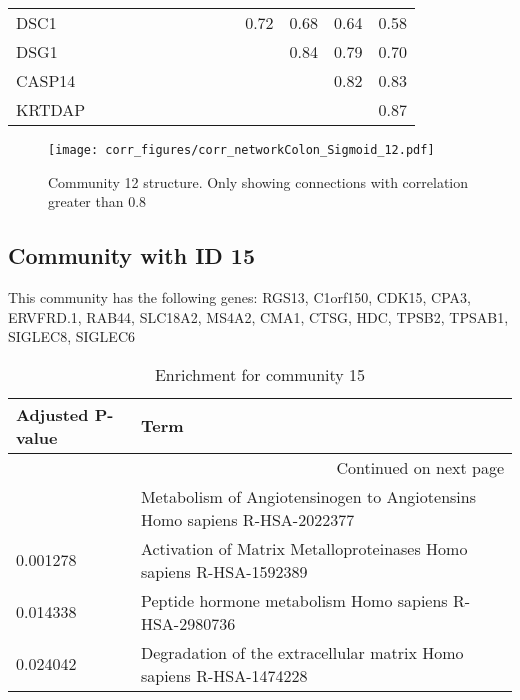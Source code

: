 \begin{longtable}{lrrrrrrrrrrrrr}
DSC1      &            &           &              &            &            &                 &             &             &            &       0.72 &         0.68 &         0.64 &       0.58 \\
DSG1      &            &           &              &            &            &                 &             &             &            &            &         0.84 &         0.79 &       0.70 \\
CASP14    &            &           &              &            &            &                 &             &             &            &            &              &         0.82 &       0.83 \\
KRTDAP    &            &           &              &            &            &                 &             &             &            &            &              &              &       0.87 \\
\end{longtable}


\begin{figure}[h!]
\centering
\texttt{[image: corr\_figures/corr\_networkColon\_Sigmoid\_12.pdf]}
\caption{Community 12 structure. Only showing connections with correlation greater than 0.8}
\end{figure}




\subsection*{Community with ID 15}
This community has the following genes: RGS13, C1orf150, CDK15, CPA3, ERVFRD.1, RAB44, SLC18A2, MS4A2, CMA1, CTSG, HDC, TPSB2, TPSAB1, SIGLEC8, SIGLEC6
\\
\begin{longtable}{p{2.4cm}p{14.5cm}}
\caption{Enrichment for community 15}\\
\toprule
Adjusted \newline P-value &                                                                      Term \\
\midrule
\endhead
\midrule
\multicolumn{2}{r}{{Continued on next page}} \\
\midrule
\endfoot

\bottomrule
\endlastfoot
                 0.000291 &  Metabolism of Angiotensinogen to Angiotensins Homo sapiens R-HSA-2022377 \\
                 0.001278 &        Activation of Matrix Metalloproteinases Homo sapiens R-HSA-1592389 \\
                 0.014338 &                     Peptide hormone metabolism Homo sapiens R-HSA-2980736 \\
                 0.024042 &        Degradation of the extracellular matrix Homo sapiens R-HSA-1474228 \\
\end{longtable}


